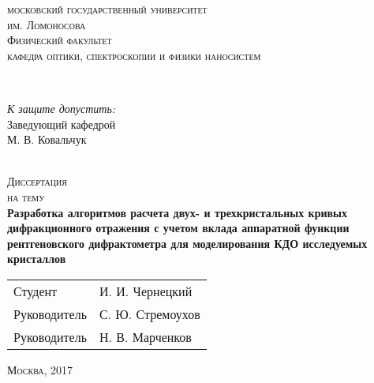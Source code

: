 \begin{titlepage}
  \begin{center}
    \textsc{\small \large московский государственный университет \\ им. Ломоносова}\\
    \textsc{\small Физический факультет}\\
    \textsc{\small кафедра оптики, спектроскопии и физики наносистем}\\[0.5cm]

    \begin{minipage}{\textwidth}
      \begin{flushleft}

      \end{flushleft}
    \end{minipage}\\[0.5cm]
    \begin{minipage}{\textwidth}
      \begin{flushright}
        \textit{К защите допустить:}\\
        Заведующий кафедрой \\
        \underline{\hspace*{4.5cm}} М. В. Ковальчук
      \end{flushright}
    \end{minipage}\\[1.5cm]
    \textsc{\large Диссертация}\\
    \textsc{\small на тему}\\[0.5cm]
    \textbf{\large Разработка алгоритмов расчета двух- и трехкристальных кривых дифракционного отражения с учетом вклада аппаратной функции рентгеновского дифрактометра для моделирования КДО исследуемых кристаллов}\\[5cm]
    {\small
      \begin{tabular}{ l l }
        Студент \hspace*{10cm} & И. И. Чернецкий\\
        Руководитель & С. Ю. Стремоухов\\
        Руководитель & Н. В. Марченков

      \end{tabular}
    }
    \vfill
    \textsc{\small Москва, 2017}
  \end{center}
\end{titlepage}
